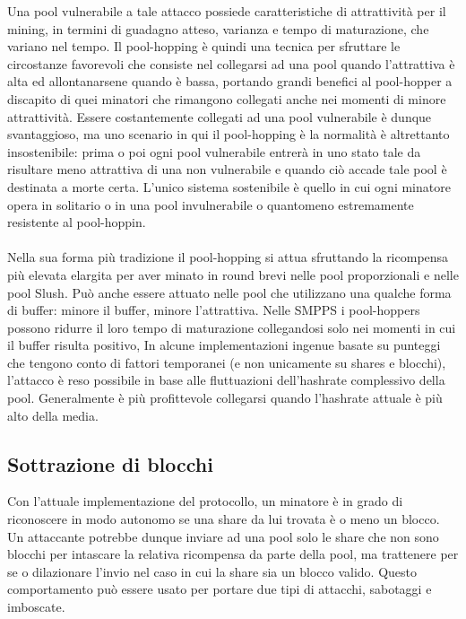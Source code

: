 Una pool vulnerabile a tale attacco possiede caratteristiche di attrattività per il mining, in termini di guadagno atteso, varianza e tempo di maturazione, che variano nel tempo. Il pool-hopping è quindi una tecnica per sfruttare le circostanze favorevoli che consiste nel collegarsi ad una pool quando l'attrattiva è alta ed allontanarsene quando è bassa, portando grandi benefici al pool-hopper a discapito di quei minatori che rimangono collegati anche nei momenti di minore attrattività.
Essere costantemente collegati ad una pool vulnerabile è dunque svantaggioso, ma uno scenario in qui il pool-hopping è la normalità è altrettanto insostenibile: prima o poi ogni pool vulnerabile entrerà in uno stato tale da risultare meno attrattiva di una non vulnerabile e quando ciò accade tale pool è destinata a morte certa. L'unico sistema sostenibile è quello in cui ogni minatore opera in solitario o in una pool invulnerabile o quantomeno estremamente resistente al pool-hoppin.\\\\
Nella sua forma più tradizione il pool-hopping si attua sfruttando la ricompensa più elevata elargita per aver minato in round brevi nelle pool proporzionali e nelle pool Slush.
Può anche essere attuato nelle pool che utilizzano una qualche forma di buffer: minore il buffer, minore l'attrattiva. Nelle SMPPS i pool-hoppers possono ridurre il loro tempo di maturazione collegandosi solo nei momenti in cui il buffer risulta positivo,
In alcune implementazioni ingenue basate su punteggi che tengono conto di fattori temporanei (e non unicamente su shares e blocchi), l'attacco è reso possibile in base alle fluttuazioni dell'hashrate complessivo della pool. Generalmente è più profittevole collegarsi quando l'hashrate attuale è più alto della media.

\subsection{Sottrazione di blocchi}

Con l'attuale implementazione del protocollo, un minatore è in grado di riconoscere in modo autonomo se una share da lui trovata è o meno un blocco. Un attaccante potrebbe dunque inviare ad una pool solo le share che non sono blocchi per intascare la relativa ricompensa da parte della pool, ma trattenere per se o dilazionare l'invio nel caso in cui la share sia un blocco valido. Questo comportamento può essere usato per portare due tipi di attacchi, sabotaggi e imboscate.


